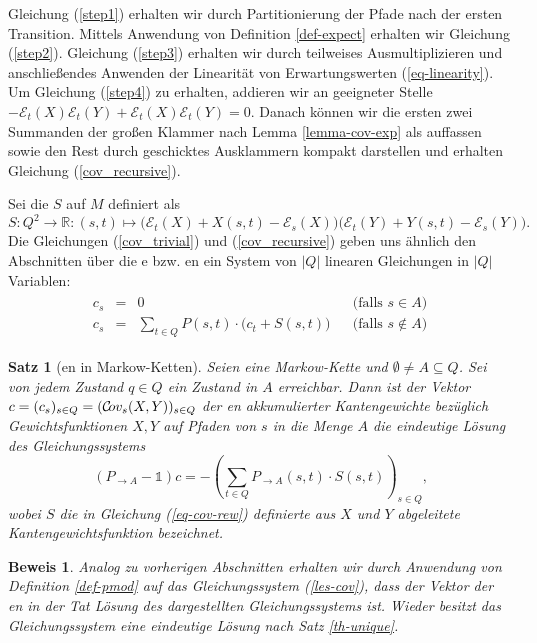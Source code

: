 \documentclass[a4paper]{article}
\newcommand{\mc}{Markow-Kette}
\newtheorem{satz}{Satz}[section] %
\theoremstyle{nonumberplain}
\newtheorem{beweis}{Beweis}
\begin{document}
Gleichung (\ref{step1}) erhalten wir durch Partitionierung der Pfade nach der ersten Transition.
Mittels Anwendung von Definition \ref{def-expect} erhalten wir Gleichung (\ref{step2}).
Gleichung (\ref{step3}) erhalten wir durch teilweises Ausmultiplizieren und anschließendes Anwenden der Linearität von Erwartungswerten (\ref{eq-linearity}). Um Gleichung (\ref{step4}) zu erhalten, addieren wir an geeigneter Stelle $- \mathcal{E}_{t}(X)\mathcal{E}_{t}(Y) + \mathcal{E}_{t}(X)\mathcal{E}_{t}(Y) = 0$. Danach können wir die ersten zwei Summanden der großen Klammer nach Lemma \ref{lemma-cov-exp} als \cov{} auffassen sowie den Rest durch geschicktes Ausklammern kompakt darstellen und erhalten Gleichung (\ref{cov_recursive}).

Sei die \reward{} $S$ auf $M$ definiert als
\begin{equation}
S: Q^2 \to \mathbb{R} : (s,t) \mapsto \big(\mathcal{E}_{t}(X) + X(s,t) - \mathcal{E}_{s}(X)\big)\big(\mathcal{E}_{t}(Y) + Y(s,t) - \mathcal{E}_{s}(Y)\big)\text{.} \label{eq-cov-rew}
\end{equation}
Die Gleichungen (\ref{cov_trivial}) und (\ref{cov_recursive}) geben uns ähnlich den Abschnitten über die \expect{}e bzw. \cov{}en ein System von $|Q|$ linearen Gleichungen in $|Q|$ Variablen:
\begin{align}
\begin{aligned}
c_s & = & 0 && \text{(falls $s \in A$)}\\
c_s & = & \sum_{t \in Q}P(s,t) \cdot \big(c_t + S(s,t)\big) && \text{(falls $s \notin A$)} 
\end{aligned} \label{les-cov}
\end{align}
\begin{satz}[\cov{}en in \mc{}n] \label{th-cov}
	\; Seien \mcex{} eine \mc{} und $\emptyset \neq A\subseteq Q$. Sei von jedem Zustand $q\in Q$ ein Zustand in $A$ erreichbar. Dann ist der Vektor $c = (c_s)_{s \in Q } = (\mathcal{C}\!ov_{s}(X,Y))_{s \in Q }$ der \cov{}en akkumulierter Kantengewichte bezüglich Gewichtsfunktionen $X,Y$ auf Pfaden von $s$ in die Menge $A$ die eindeutige Lösung des Gleichungssystems
	\begin{equation}
	(P_{\rightarrow A} - \mathbb{1}) c = - \left(\sum_{t \in Q}{ P_{\rightarrow A}(s,t) \cdot S(s,t) }\right)_{s \in Q} \text{,}\label{les-cov-mat}
	\end{equation}
	wobei $S$ die in Gleichung (\ref{eq-cov-rew}) definierte aus $X$ und $Y$ abgeleitete Kantengewichtsfunktion bezeichnet.
\end{satz}
\begin{beweis}
	Analog zu vorherigen Abschnitten erhalten wir durch Anwendung von Definition \ref{def-pmod} auf das Gleichungssystem (\ref{les-cov}), dass der Vektor der \cov{}en in der Tat Lösung des dargestellten Gleichungssystems ist. Wieder besitzt das Gleichungssystem eine eindeutige Lösung nach Satz \ref{th-unique}.
\end{beweis}
\end{document}
